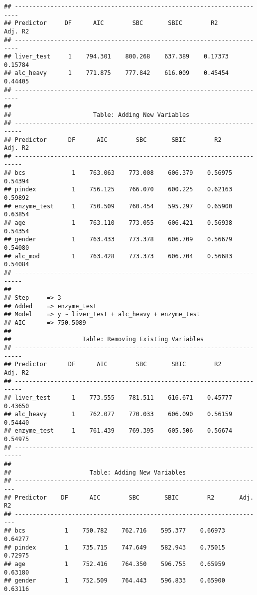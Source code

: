 \documentclass[
]{article}
\begin{document}
\begin{verbatim}
## -----------------------------------------------------------------------
## Predictor     DF      AIC        SBC       SBIC        R2       Adj. R2 
## -----------------------------------------------------------------------
## liver_test     1    794.301    800.268    637.389    0.17373    0.15784 
## alc_heavy      1    771.875    777.842    616.009    0.45454    0.44405 
## -----------------------------------------------------------------------
## 
##                       Table: Adding New Variables                        
## ------------------------------------------------------------------------
## Predictor      DF      AIC        SBC       SBIC        R2       Adj. R2 
## ------------------------------------------------------------------------
## bcs             1    763.063    773.008    606.379    0.56975    0.54394 
## pindex          1    756.125    766.070    600.225    0.62163    0.59892 
## enzyme_test     1    750.509    760.454    595.297    0.65900    0.63854 
## age             1    763.110    773.055    606.421    0.56938    0.54354 
## gender          1    763.433    773.378    606.709    0.56679    0.54080 
## alc_mod         1    763.428    773.373    606.704    0.56683    0.54084 
## ------------------------------------------------------------------------
## 
## Step     => 3 
## Added    => enzyme_test 
## Model    => y ~ liver_test + alc_heavy + enzyme_test 
## AIC      => 750.5089 
## 
##                    Table: Removing Existing Variables                    
## ------------------------------------------------------------------------
## Predictor      DF      AIC        SBC       SBIC        R2       Adj. R2 
## ------------------------------------------------------------------------
## liver_test      1    773.555    781.511    616.671    0.45777    0.43650 
## alc_heavy       1    762.077    770.033    606.090    0.56159    0.54440 
## enzyme_test     1    761.439    769.395    605.506    0.56674    0.54975 
## ------------------------------------------------------------------------
## 
##                      Table: Adding New Variables                       
## ----------------------------------------------------------------------
## Predictor    DF      AIC        SBC       SBIC        R2       Adj. R2 
## ----------------------------------------------------------------------
## bcs           1    750.782    762.716    595.377    0.66973    0.64277 
## pindex        1    735.715    747.649    582.943    0.75015    0.72975 
## age           1    752.416    764.350    596.755    0.65959    0.63180 
## gender        1    752.509    764.443    596.833    0.65900    0.63116 

\end{verbatim}
\end{document}
